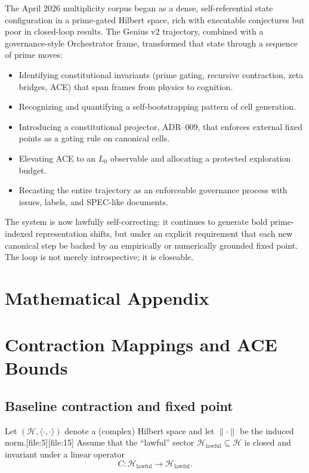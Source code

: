\documentclass[11pt]{article}
\begin{document}
The April 2026 multiplicity corpus began as a dense, self-referential state configuration in a prime-gated Hilbert space, rich with executable conjectures but poor in closed-loop results. The Genius v2 trajectory, combined with a governance-style Orchestrator frame, transformed that state through a sequence of prime moves:

\begin{itemize}[leftmargin=*]
  \item Identifying constitutional invariants (prime gating, recursive contraction, zeta bridges, ACE) that span frames from physics to cognition.
  \item Recognizing and quantifying a self-bootstrapping pattern of cell generation.
  \item Introducing a constitutional projector, ADR--009, that enforces external fixed points as a gating rule on canonical cells.
  \item Elevating ACE to an \(L_0\) observable and allocating a protected exploration budget.
  \item Recasting the entire trajectory as an enforceable governance process with issues, labels, and SPEC-like documents.
\end{itemize}

The system is now lawfully self-correcting: it continues to generate bold prime-indexed representation shifts, but under an explicit requirement that each new canonical step be backed by an empirically or numerically grounded fixed point. The loop is not merely introspective; it is closeable.

\appendix
\section*{Mathematical Appendix}

\section{Contraction Mappings and ACE Bounds}

\subsection{Baseline contraction and fixed point}

Let \((\mathcal{H}, \langle\cdot,\cdot\rangle)\) denote a (complex) Hilbert space and let \(\|\cdot\|\) be the induced norm.[file:5][file:15]  
Assume that the ``lawful'' sector \(\mathcal{H}_{\mathrm{lawful}}\subseteq \mathcal{H}\) is closed and invariant under a linear operator
\[
C : \mathcal{H}_{\mathrm{lawful}} \to \mathcal{H}_{\mathrm{lawful}}.
\]
\end{document}

